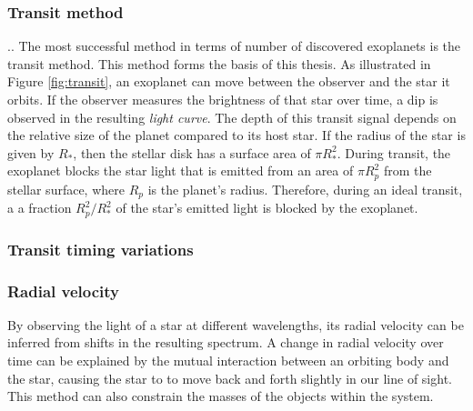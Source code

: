 \subsubsection{Transit method}
\label{sec:transit_method}
..
The most successful method in terms of number of discovered exoplanets is the transit method. This method forms the basis of this thesis. As illustrated in Figure \ref{fig:transit}, an exoplanet can move between the observer and the star it orbits. If the observer measures the brightness of that star over time, a dip is observed in the resulting \textit{light curve}. The depth of this transit signal depends on the relative size of the planet compared to its host star. If the radius of the star is given by $R_*$, then the stellar disk has a surface area of $\pi R_*^2$. During transit, the exoplanet blocks the star light that is emitted from an area of $\pi R_{p}^2$ from the stellar surface, where $R_{p}$ is the planet's radius. Therefore, during an ideal transit, a a fraction $R_{p}^2/R_*^2$ of the star's emitted light is blocked by the exoplanet.


\subsubsection{Transit timing variations}


\subsubsection{Radial velocity}
By observing the light of a star at different wavelengths, its radial velocity can be inferred from shifts in the resulting spectrum. A change in radial velocity over time can be explained by the mutual interaction between an orbiting body and the star, causing the star to to move back and forth slightly in our line of sight. This method can also constrain the masses of the objects within the system.

